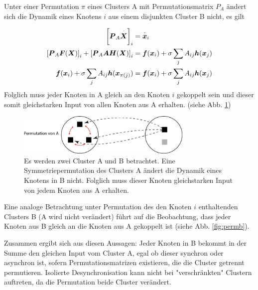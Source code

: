 Unter einer Permutation $\pi$ eines Clusters A mit Permutationsmatrix $P_A$ ändert sich die Dynamik eines Knotens $i$ aus einem disjunkten Cluster B nicht, es gilt



\begin{align}
		\notag \left[\boldsymbol{P}_A	\overset{\cdot}{\boldsymbol{X}}\right]_i&= \overset{\cdot}{\boldsymbol{x}}_i\\
		\notag\left[\boldsymbol{P}_A \boldsymbol{F}(\boldsymbol{X})\right]_i+
			\left[\boldsymbol{P}_A\boldsymbol{A}\boldsymbol{H}(\boldsymbol{X})\right]_i&=
			\boldsymbol{f}(\boldsymbol{x}_i)+
			\sigma\sum_j A_{ij}\boldsymbol{h}(\boldsymbol{x}_j)\\
		\boldsymbol{f}(\boldsymbol{x}_i)+
			\sigma\sum_j A_{ij}\boldsymbol{h}(\boldsymbol{x}_{\pi\left(j\right)})&=
		\boldsymbol{f}(\boldsymbol{x}_i)+
			\sigma\sum_j A_{ij}\boldsymbol{h}(\boldsymbol{x}_j)		
\end{align}
Folglich muss jeder Knoten in A gleich an den Knoten $i$ gekoppelt sein und dieser somit gleichstarken Input von allen Knoten aus A erhalten. (siehe Abb. \ref{fig:perma})

\begin{figure}
		\includegraphics[width=0.75\textwidth]{abb/misc/perm_a.png}
		\caption{Es werden zwei Cluster A und B betrachtet. Eine Symmetriepermutation des Clusters A ändert die Dynamik eines Knotens in B nicht. Folglich muss dieser Knoten gleichstarken Input von jedem Knoten aus A erhalten.}
		\label{fig:perma}
\end{figure}


Eine analoge Betrachtung  unter Permutation des den Knoten $i$ enthaltenden Clusters B (A wird nicht verändert) führt auf die Beobachtung, dass jeder Knoten aus B gleich an die Knoten aus A gekoppelt ist (siehe Abb. \ref{fig:permb}). 

Zusammen ergibt sich aus diesen Aussagen: Jeder Knoten in B bekommt in der Summe den gleichen Input vom Cluster A, egal ob dieser synchron oder asynchron ist, sofern Permutationsmatrizen existieren, die die Cluster getrennt permutieren. Isolierte Desynchronisation kann nicht bei "verschränkten" Clustern auftreten, da die Permutation beide Cluster verändert.

